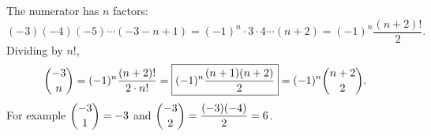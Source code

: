 The numerator has $n$ factors:
\[(-3)(-4)(-5)\cdots(-3-n+1)=(-1)^n\cdot3\cdot4\cdots(n+2)=(-1)^n\dfrac{(n+2)!}{2}.\]
Dividing by $n!$,
\[\dbinom{-3}{n}=(-1)^n\dfrac{(n+2)!}{2\cdot n!}=\boxed{(-1)^n\dfrac{(n+1)(n+2)}{2}}=(-1)^n\dbinom{n+2}{2}.\]
For example $\dbinom{-3}{1}=-3$ and $\dbinom{-3}{2}=\dfrac{(-3)(-4)}{2}=6$.
